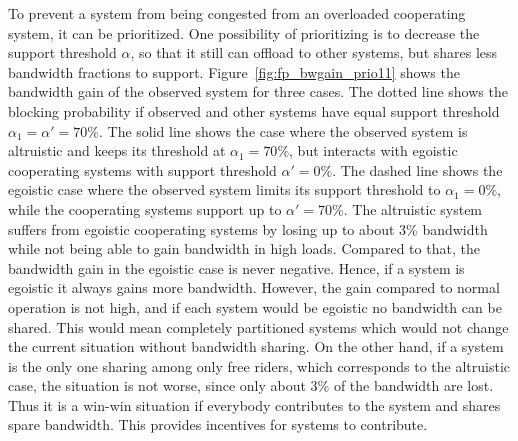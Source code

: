 To prevent a system from being congested from an overloaded cooperating system, it can be prioritized. One possibility of prioritizing is to decrease the support threshold $\alpha$, so that it still can offload to other systems, but shares less bandwidth fractions to support. Figure~\ref{fig:fp_bwgain_prio11} shows the bandwidth gain of the observed system for three cases. The dotted line shows the blocking probability if observed and other systems have equal support threshold $\alpha_1=\alpha'=70\%$. The solid line shows the case where the observed system is altruistic and keeps its threshold at $\alpha_1=70\%$, but interacts with egoistic cooperating systems with support threshold $\alpha'=0\%$. The dashed line shows the egoistic case where the observed system limits its support threshold to $\alpha_1=0\%$, while the cooperating systems support up to $\alpha'=70\%$. The altruistic system suffers from egoistic cooperating systems by losing up to about 3\% bandwidth while not being able to gain bandwidth in high loads. Compared to that, the bandwidth gain in the egoistic case is never negative.
Hence, if a system is egoistic it always gains more bandwidth. However, the gain compared to normal operation is not high, and if each system would be egoistic no bandwidth can be shared. This would mean completely partitioned systems which would not change the current situation without bandwidth sharing.
On the other hand, if a system is the only one sharing among only free riders, which corresponds to the altruistic case, the situation is not worse, since only about 3\% of the bandwidth are lost.
Thus it is a win-win situation if everybody contributes to the system and shares spare bandwidth.
This provides incentives for systems to contribute.
%
%
